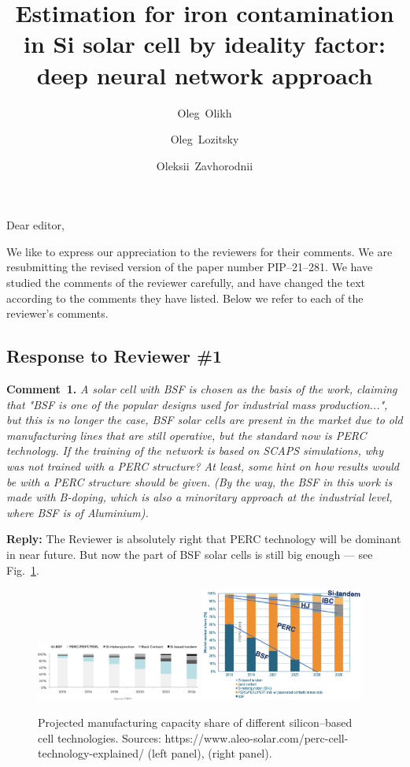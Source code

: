 \documentclass[num-refs]{wiley-article} %
\title{Estimation for iron contamination in Si solar cell by ideality factor: deep neural network approach}
\author[1]{Oleg~Olikh}
\author[1]{Oleg~Lozitsky}
\author[1]{Oleksii~Zavhorodnii}
\affil[1]{Taras Shevchenko National University of Kyiv, 64/13, Volodymyrska Street, Kyiv, 01601, Ukraine}
\begin{document}
Dear editor,

We like to express our appreciation to the reviewers for their comments.
We are resubmitting the revised version of the paper number PIP--21--281.
We have studied the comments of the reviewer carefully,
and have changed the text according to the comments they
have listed.
Below we refer to each of the reviewer’s comments.


\subsection*{Response to Reviewer \#1 }



\noindent
\textcolor[rgb]{0.00,0.50,1.00}{\textbf{Comment~1.}}
\emph{A solar cell with BSF is chosen as the basis of the work, claiming that
"BSF is one of the popular designs used for industrial mass production...",
but this is no longer the case, BSF solar cells are present in the market due to old manufacturing lines that are still operative, but the standard now is PERC technology.
If the training of the network is based on SCAPS simulations, why was not trained with a PERC structure?
At least, some hint on how results would be with a PERC structure should be given.
(By the way, the BSF in this work is made with B-doping, which is also a minoritary approach at the industrial level, where BSF is of Aluminium).}

\vspace{0.5cm}
\noindent
\textcolor[rgb]{0.51,0.00,0.00}{\textbf{Reply:}}
The Reviewer is absolutely right that PERC technology will be dominant in near future.
But now the part of BSF solar cells is still big enough --- see Fig.~\ref{fig_BSF}.


\begin{figure}[b]
\centering
\includegraphics[width=0.48\textwidth]{BSF_PERC1}
\includegraphics[width=0.48\textwidth]{BSF_PERC2}
\caption{Projected manufacturing capacity share of different
silicon--based cell technologies.
Sources:  https://www.aleo-solar.com/perc-cell-technology-explained/
(left panel), \cite{GreenRew2019} (right panel).
}
\label{fig_BSF}
\end{figure}
\end{document}

